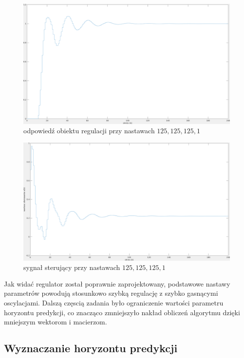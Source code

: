 \documentclass[fleqn]{article}
\begin{document}
\begin{figure}[H]
	\includegraphics[width=\textwidth]{scripts/regDDD2.png}
	\caption{odpowiedź obiektu regulacji przy nastawach $125, 125, 125, 1$}
\end{figure}
\begin{figure}[H]
	\includegraphics[width=\textwidth]{scripts/regDDDster2.png}
	\caption{sygnał sterujący przy nastawach $125, 125, 125, 1$}
	\label{}
\end{figure}

Jak widać regulator został poprawnie zaprojektowany, podstawowe nastawy parametrów powodują stosunkowo szybką regulację z szybko gasnącymi oscylacjami. Dalszą częscią zadania było ograniczenie wartości parametru horyzontu predykcji, co znacząco zmniejszyło nakład obliczeń algorytmu dzięki mniejszym wektorom i macierzom.

\subsection{Wyznaczanie horyzontu predykcji}
\end{document}
